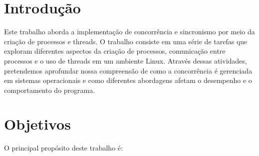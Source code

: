 \documentclass[
	12pt,				%
	openright,			%
	oneside,			%
	a4paper,			%
	chapter=TITLE,		%
	english,			%
	french,				%
	spanish,			%
	brazil				%
	]{abntex2}
\theoremstyle{definition}
\begin{document}
\frenchspacing 

\imprimircapa


\imprimirfolhaderosto

\newpage

\setlength{\absparsep}{18pt} %

\tableofcontents*
\cleardoublepage
\textual


\chapter{Introdução}

Este trabalho aborda a implementação de concorrência e 
sincronismo por meio da criação de processos e threads. O 
trabalho consiste em uma série de tarefas que exploram diferentes 
aspectos da criação de processos, comunicação entre processos e o 
uso de threads em um ambiente Linux. Através dessas atividades, 
pretendemos aprofundar nossa compreensão de como a concorrência é 
gerenciada em sistemas operacionais e como diferentes abordagens afetam 
o desempenho e o comportamento do programa.

\chapter{Objetivos}

O principal propósito deste trabalho é:
\end{document}
